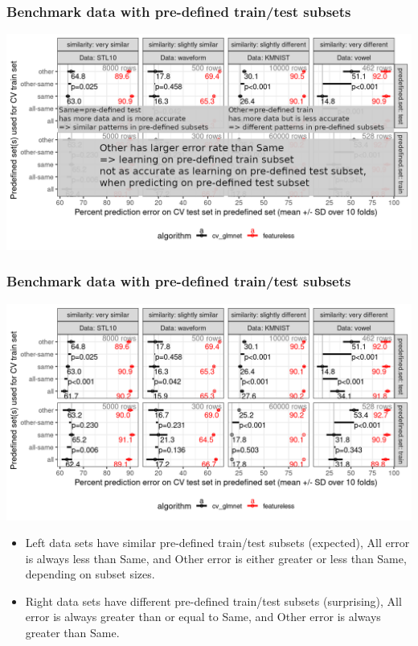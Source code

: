 \documentclass[t]{beamer}
\begin{document}
\begin{frame}
  \frametitle{Benchmark data with pre-defined train/test subsets}
  \includegraphics[width=\textwidth]{data_Classif_batchmark_registry_glmnet_featureless_mean_sd_other_test}
\end{frame}
 
\begin{frame}
  \frametitle{Benchmark data with pre-defined train/test subsets}
  \includegraphics[width=\textwidth]{data_Classif_batchmark_registry_glmnet_featureless_mean_sd}
  \vskip -0.5cm
  \begin{itemize}
  \item Left data sets have similar pre-defined train/test subsets (expected), All error is always less than Same, and Other error is either greater or less than Same, depending on subset sizes. 
  \item Right data sets have different pre-defined train/test subsets (surprising), All error is always greater than or equal to Same, and Other error is always greater than Same.
  \end{itemize}
\end{frame}
\end{document}
